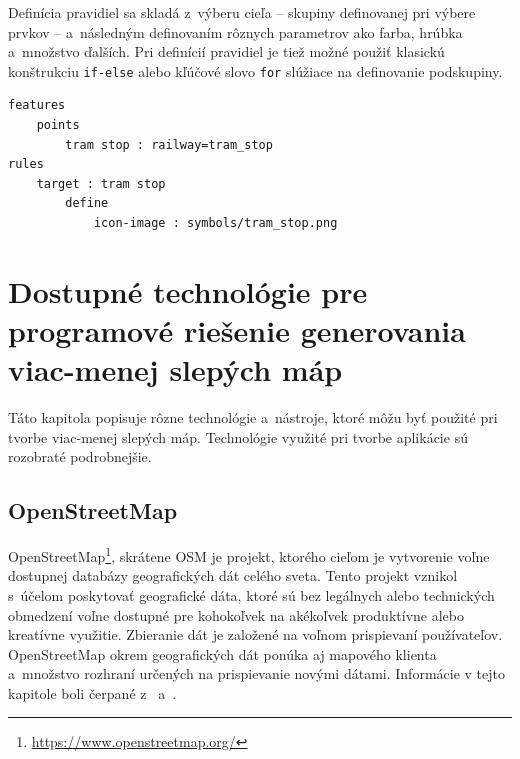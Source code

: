 Definícia pravidiel sa skladá z~výberu cieľa -- skupiny definovanej pri výbere prvkov -- a~následným definovaním rôznych parametrov ako farba, hrúbka a~množstvo ďalších. Pri definícií pravidiel je tiež možné použiť klasickú konštrukciu {\tt if-else} alebo kľúčové slovo {\tt for} slúžiace na definovanie podskupiny.~\cite{maperitive}

\begin{lstlisting}[frame=single,aboveskip=20pt,belowskip=20pt,framesep=10pt,caption={Príklad súboru pravidiel v~aplikácií Maperitive. Vyberá prvky typu bod označujúce zastávky električiek a~definuje ako majú byť vykreslené.},label={maperitive_code}]
features
    points
        tram stop : railway=tram_stop
rules
    target : tram stop
        define
            icon-image : symbols/tram_stop.png
\end{lstlisting}


\chapter{Dostupné technológie pre programové riešenie generovania viac-menej slepých máp}
\label{tools}
Táto kapitola popisuje rôzne technológie a~nástroje, ktoré môžu byť použité pri tvorbe viac-menej slepých máp. Technológie využité pri tvorbe aplikácie sú rozobraté podrobnejšie.

\section{OpenStreetMap}
\label{osm}
OpenStreetMap\footnote{\url{https://www.openstreetmap.org/}}, skrátene OSM je projekt, ktorého cieľom je vytvorenie voľne dostupnej databázy geografických dát celého sveta. Tento projekt vznikol s~účelom poskytovať geografické dáta, ktoré sú bez legálnych alebo technických obmedzení voľne dostupné pre kohokoľvek na akékoľvek produktívne alebo kreatívne využitie. Zbieranie dát je založené na voľnom prispievaní používateľov. OpenStreetMap okrem geografických dát ponúka aj mapového klienta a~množstvo rozhraní určených na prispievanie novými dátami. Informácie v tejto kapitole boli čerpané z~\cite{osm_page} a~\cite{osm_article}.

